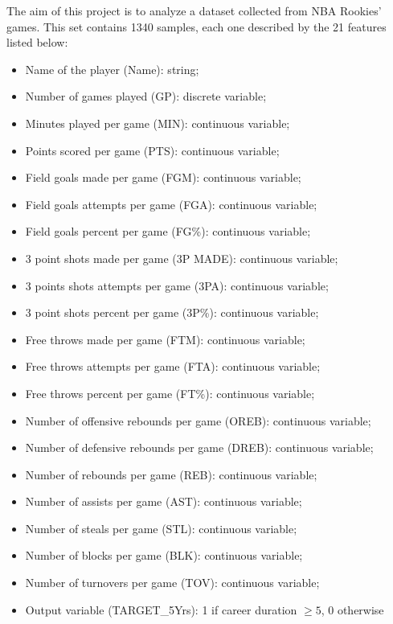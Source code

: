The aim of this project is to analyze a dataset collected from NBA Rookies' games. This set contains 1340 samples, each one described by the 21 features listed below: 
\begin{itemize}
	\item Name of the player (Name): string;
	\item Number of games played (GP): discrete variable;
	\item Minutes played per game (MIN): continuous variable;
	\item Points scored per game (PTS): continuous variable;
	\item Field goals made per game (FGM): continuous variable;
	\item Field goals attempts per game (FGA): continuous variable;
	\item Field goals percent per game (FG\%): continuous variable;
	\item 3 point shots made per game (3P MADE): continuous variable;
	\item 3 points shots attempts per game (3PA): continuous variable;
	\item 3 point shots percent per game (3P\%): continuous variable;
	\item Free throws made per game (FTM): continuous variable;
	\item Free throws attempts per game (FTA): continuous variable;
	\item Free throws percent per game (FT\%): continuous variable;
	\item Number of offensive rebounds per game (OREB): continuous variable;
	\item Number of defensive rebounds per game (DREB): continuous variable;
	\item Number of rebounds per game (REB): continuous variable;
	\item Number of assists per game (AST): continuous variable;
	\item Number of steals per game (STL): continuous variable;
	\item Number of blocks per game (BLK): continuous variable;
	\item Number of turnovers per game (TOV): continuous variable;
	\item Output variable (TARGET\_5Yrs): 1 if career duration $\geq 5$, 0 otherwise\\
\end{itemize} 

